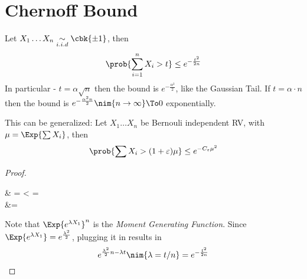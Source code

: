 \documentclass[a4paper, 11pt, oneside]{book}
\begin{document}
	\section{Chernoff Bound}
	\begin{thm}
		\label{thm: Chernoff Bound} Let $X_1\ldots X_n\underset{i.i.d}{\sim}\cbk{\pm1}$, then
		\[
		\prob{\sum_{i=1}^n X_i > t}\le e^{-\frac{t^2}{2n}}
		\]
		In particular - $t = \alpha\sqrt{n}$ then the bound is $ e^{-\frac{\alpha^2}{2}}$, like the Gaussian Tail. If $t = \alpha\cdot n$ then the bound is $e^{-\frac{\alpha^2n}{2}}\nim{n\to\infty}\To 0$ exponentially.
	\end{thm}	
	\begin{remark}
		This can be generalized: Let $X_1\ldots X_n$ be Bernouli independent RV, with $\mu = \Exp{\sum X_i}$, then
		\[
		\prob{\sum X_i > (1+\varepsilon)\mu} \le e^{-C_\varepsilon \mu^2}
		\]
	\end{remark}
	\begin{proof}
		\begin{flalign*}
			& = <  = \\
			&= 
		\end{flalign*}
		Note that $\Exp{e^{\lambda X_1}}^n$ is the \emph{Moment Generating Function}. Since $\Exp{e^{\lambda X_1}} = e^{\frac{\lambda^2}{2}}$, plugging it in results in
		\[
		e^{\frac{\lambda^2}{2}n - \lambda t} \nim{\lambda = t/n}=e^{-\frac{t^2}{2n}} 
		\]
	\end{proof}
	
\end{document}

